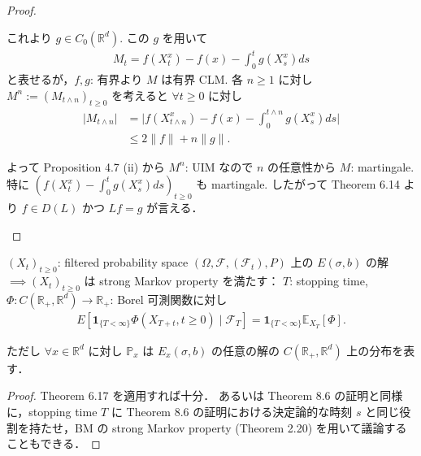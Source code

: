 \documentclass{jsarticle}
\begin{document}
\begin{proof}
\begin{enumerate}[label=(\arabic*)]
        これより $g\in C_{0}(\mathbb{R}^d).$
        この $g$ を用いて
        \begin{align}
            M_{t}
            = f(X_{t}^{x})
            - f(x)
            - \int_{0}^{t}g(X_{s}^{x})ds
        \end{align}
        と表せるが，$f, g$: 有界より $M$ は有界 CLM.
        各 $n\ge1$ に対し $M^n:=(M_{t\wedge n})_{t\ge0}$ を考えると $\forall t\ge0$ に対し
        \begin{align}
            \lvert M_{t\wedge n}\rvert
            &= \lvert f(X_{t\wedge n}^{x})
            - f(x)
            - \int_{0}^{t\wedge n}g(X_{s}^{x})ds\rvert \\
            &\le 2\lVert f\rVert + n\lVert g\rVert.
        \end{align}
        
        よって Proposition 4.7 (ii) から $M^n$: UIM なので $n$ の任意性から $M$: martingale.
        特に $(f(X_{t}^{x}) - \int_{0}^{t}g(X_{s}^{x})ds)_{t\ge0}$ も martingale.
        したがって Theorem 6.14 より $f\in D(L)$ かつ $Lf=g$ が言える．
    \end{enumerate}
\end{proof}

\begin{screen}
    \begin{cor}\label{cor:808}
        $(X_{t})_{t\ge0}$: filtered probability space $(\Omega, \mathcal{F}, (\mathcal{F}_t), P)$ 上の $E(\sigma, b)$ の解 \\
        $\implies (X_{t})_{t\ge0}$ は strong Markov property を満たす：
        $T$: stopping time, $\Phi:C(\mathbb{R}_{+}, \mathbb{R}^d)\to\mathbb{R}_{+}$: Borel 可測関数に対し
        \begin{align}
            E[\bm{1}_{\{T<\infty\}}\Phi(X_{T+t}, t\ge0)\mid\mathcal{F}_{T}]
            = \bm{1}_{\{T<\infty\}}\mathbb{E}_{X_{T}}[\Phi].
        \end{align}

        ただし $\forall x\in\mathbb{R}^d$ に対し $\mathbb{P}_{x}$ は $E_{x}(\sigma, b)$ の任意の解の $C(\mathbb{R}_{+}, \mathbb{R}^d)$ 上の分布を表す．
    \end{cor}
\end{screen}

\begin{proof}
    Theorem 6.17 を適用すれば十分．
    あるいは Theorem 8.6 の証明と同様に，stopping time $T$ に Theorem 8.6 の証明における決定論的な時刻 $s$ と同じ役割を持たせ，BM の strong Markov property (Theorem 2.20) を用いて議論することもできる．
\end{proof}
\end{document}
